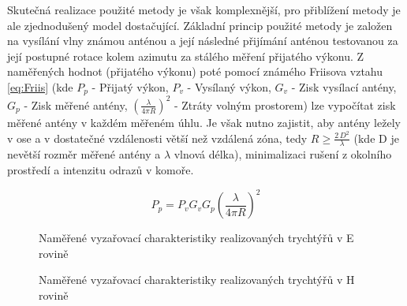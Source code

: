 Skutečná realizace použité metody je však komplexnější, pro přiblížení metody je ale zjednodušený model dostačující.
Základní princip použité metody je založen na vysílání vlny známou anténou a její následné přijímání anténou testovanou za její postupné rotace kolem azimutu za stálého měření přijatého výkonu. Z naměřených hodnot (přijatého výkonu) poté pomocí známého Friisova vztahu \ref{eq:Friis} (kde $P_p$ - Přijatý výkon, $P_v$ - Vysílaný výkon, $G_v$ - Zisk vysílací antény, $G_p$ - Zisk měřené antény, $( \frac{\lambda}{4 \pi R} )^2$ - Ztráty volným prostorem) lze vypočítat zisk měřené antény v každém měřeném úhlu. Je však nutno zajistit, aby antény ležely v ose a v dostatečné vzdálenosti větší než vzdálená zóna, tedy $R \geq \frac{2\,D^2}{\lambda}$ (kde D je nevětší rozměr měřené antény a $\lambda$ vlnová délka), minimalizaci rušení z okolního prostředí a intenzitu odrazů v komoře.

\begin{equation}
P_p = P_v G_v G_p( \frac{\lambda}{4 \pi R} )^2
\label{eq:Friis}
\end{equation}

\begin{figure}
\label{fig:FarfieldsE}
\caption{Naměřené vyzařovací charakteristiky realizovaných trychtýřů v E rovině}
\end{figure}

\begin{figure}
\label{fig:FarfieldsH}
\caption{Naměřené vyzařovací charakteristiky realizovaných trychtýřů v H rovině}
\end{figure}

